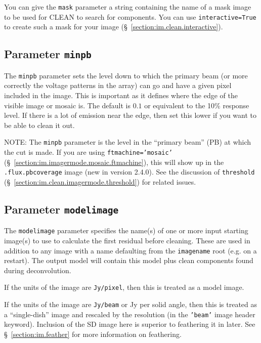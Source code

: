 You can give the {\tt mask} parameter a string containing the
name of a mask image to be used for CLEAN to search for components.  
You can use {\tt interactive=True} to create such a mask for your image
(\S~\ref{section:im.clean.interactive}).



\subsection{Parameter {\tt minpb} }
\label{section:im.clean.minpb}

The {\tt minpb} parameter sets the level down to which the primary
beam (or more correctly the voltage patterns in the array) can go and
have a given pixel included in the image.  This is important as it
defines where the edge of the visible image or mosaic is. 
The default is $0.1$ or
equivalent to the 10\% response level.  If there is a lot of emission
near the edge, then set this lower if you want to be
able to clean it out.

NOTE: The {\tt minpb} parameter is the level in the ``primary beam''
(PB) at which the cut is made.  If you are using {\tt ftmachine='mosaic'}
(\S~\ref{section:im.imagermode.mosaic.ftmachine}), this will show
up in the {\tt .flux.pbcoverage} image (new in version 2.4.0).
See the discussion of {\tt threshold} 
(\S~\ref{section:im.clean.imagermode.threshold}) for related issues.

\subsection{Parameter {\tt modelimage} }
\label{section:im.clean.modelimage}

The {\tt modelimage} parameter specifies the name(s) of one or more
input starting image(s) to use to calculate the first residual before
cleaning.  These are used in addition to any image with a name
defaulting from the {\tt imagename} root (e.g. on a restart).
The output model will contain this model plus
clean components found during deconvolution.  

If the units of the image are {\tt Jy/pixel}, then this is treated
as a model image.

If the units of the image are {\tt Jy/beam} or Jy per solid angle,
then this is treated as a ``single-dish'' image and rescaled by
the resolution (in the {\tt 'beam'} image header keyword). Inclusion
of the SD image here is superior to feathering it in later.
See \S~\ref{section:im.feather} for more information on feathering.

